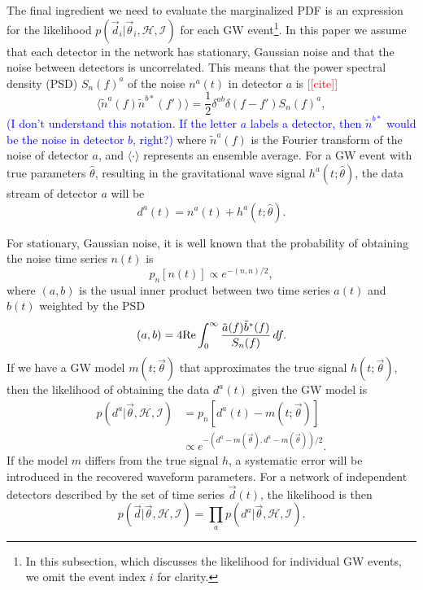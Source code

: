 \documentclass[twocolumn,prd,amssymb,aps,nofootinbib,showpacs,epsf]{revtex4}
\newcommand{\red}{\textcolor{red}}
\newcommand\les[2]{\textcolor{blue}{{#1}\sout{#2}}}
\begin{document}
The final ingredient we need to evaluate the marginalized PDF is an expression for the likelihood $p(\vec d_i | \vec\theta_i,\mathcal{H},\mathcal{I})$ for each GW event\footnote{In this subsection, which discusses the likelihood for individual GW events, we omit the event index $i$ for clarity.}. In this paper we assume that each detector in the network has stationary, Gaussian noise and that the noise between detectors is uncorrelated. This means that the power spectral density (PSD) $S_n(f)^a$ of the noise $n^a(t)$ in detector $a$ is \red{[[cite]]}
\begin{equation}
\langle \tilde n^a(f) \tilde n^{b*}(f') \rangle = \frac{1}{2} \delta^{ab} \delta (f-f') S_n(f)^a,
\end{equation}
\les{(I don't understand this notation.  If the letter $a$ labels a detector, then $\tilde{n}^{b*}$ would be the noise in detector $b$, right?)}{} where $\tilde n^a(f)$ is the Fourier transform of the noise of detector $a$, and $\langle\cdot\rangle$ represents an ensemble average. For a GW event with true parameters $\hat\theta$, resulting in the gravitational wave signal $h^a(t; \hat\theta)$, the data stream of detector $a$ will be
\begin{equation}
d^a(t) = n^a(t) + h^a(t; \hat\theta).
\end{equation}

For stationary, Gaussian noise, it is well known that the probability of obtaining the noise time series $n(t)$ is
\begin{equation}
p_n[n(t)] \propto e^{-(n, n)/2},
\end{equation}
where $(a, b)$ is the usual inner product between two time series $a(t)$ and $b(t)$ weighted by the PSD
\begin{equation}
(a, b)=4{\rm Re} \int_0^\infty \frac{\tilde a(f) \tilde b^*(f)}{S_n(f)}\,df.
\end{equation}
If we have a GW model $m(t;\vec\theta)$ that approximates the true signal $h(t;\vec\theta)$, then the likelihood of obtaining the data $d^a(t)$ given the GW model is
\begin{align}
p(d^a | \vec\theta, \mathcal{H}, \mathcal{I}) &= p_n[d^a(t)-m(t; \vec\theta)] \nonumber\\
& \propto e^{-(d^a - m(\vec\theta), d^a - m(\vec\theta))/2}.
\end{align}
If the model $m$ differs from the true signal $h$, a systematic error will be introduced in the recovered waveform parameters. For a network of independent detectors described by the set of time series $\vec d(t)$, the likelihood is then
\begin{equation}
p(\vec d | \vec\theta, \mathcal{H}, \mathcal{I}) = \prod_a p(d^a | \vec\theta, \mathcal{H}, \mathcal{I}).
\end{equation}
\end{document}
